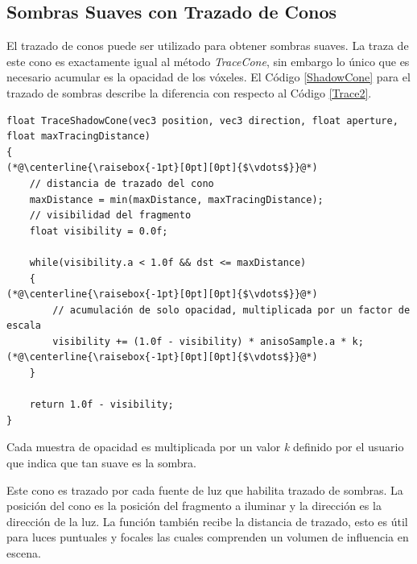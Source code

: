 \subsection{Sombras Suaves con Trazado de Conos} %
\label{sub:sombras_con_trazado_de_conos}
El trazado de conos puede ser utilizado para obtener sombras suaves. La traza de este cono es exactamente igual al método \emph{TraceCone}, sin embargo lo único que es necesario acumular es la opacidad de los vóxeles. El Código \ref{ShadowCone} para el trazado de sombras describe la diferencia con respecto al Código \ref{Trace2}.
\\
\begin{lstlisting}[caption={Trazado de sombras con conos.}, label=ShadowCone]
float TraceShadowCone(vec3 position, vec3 direction, float aperture, float maxTracingDistance)
{
(*@\centerline{\raisebox{-1pt}[0pt][0pt]{$\vdots$}}@*)
    // distancia de trazado del cono
    maxDistance = min(maxDistance, maxTracingDistance);
    // visibilidad del fragmento
    float visibility = 0.0f;
    
    while(visibility.a < 1.0f && dst <= maxDistance)
    {
(*@\centerline{\raisebox{-1pt}[0pt][0pt]{$\vdots$}}@*)
        // acumulación de solo opacidad, multiplicada por un factor de escala
        visibility += (1.0f - visibility) * anisoSample.a * k;
(*@\centerline{\raisebox{-1pt}[0pt][0pt]{$\vdots$}}@*)
    }

    return 1.0f - visibility;
}
\end{lstlisting}

Cada muestra de opacidad es multiplicada por un valor \emph{k} definido por el usuario que indica que tan suave es la sombra.

Este cono es trazado por cada fuente de luz que habilita trazado de sombras. La posición del cono es la posición del fragmento a iluminar y la dirección es la dirección de la luz. La función también recibe la distancia de trazado, esto es útil para luces puntuales y focales las cuales comprenden un volumen de influencia en escena.

